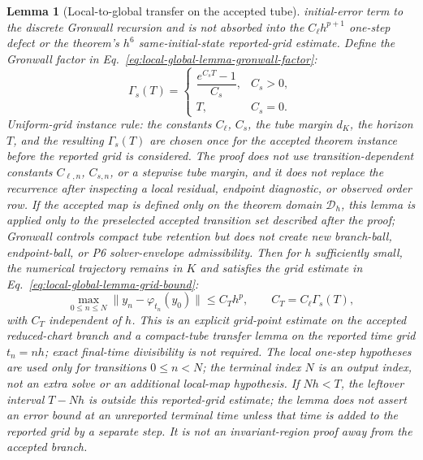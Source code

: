 \documentclass[preprint,12pt]{elsarticle}
\newtheorem{lemma}{Lemma}
\begin{document}
\begin{lemma}[Local-to-global transfer on the accepted tube]
initial-error term to the discrete Gronwall recursion and is not absorbed into
the \(C_\ell h^{p+1}\) one-step defect or the theorem's \(h^6\)
same-initial-state reported-grid estimate.
Define the Gronwall factor in
Eq.~\eqref{eq:local-global-lemma-gronwall-factor}:
\begin{equation}
\label{eq:local-global-lemma-gronwall-factor}
  \Gamma_s(T)=
  \begin{cases}
    \dfrac{e^{C_sT}-1}{C_s}, & C_s>0,\\[0.6em]
    T, & C_s=0 .
  \end{cases}
\end{equation}
Uniform-grid instance rule: the constants \(C_\ell\), \(C_s\), the tube
margin \(d_K\), the horizon \(T\), and the resulting \(\Gamma_s(T)\) are
chosen once for the accepted theorem instance before the reported grid is
considered.  The proof does not use transition-dependent constants
\(C_{\ell,n}\), \(C_{s,n}\), or a stepwise tube margin, and it does not
replace the recurrence after inspecting a local residual, endpoint diagnostic,
or observed order row.  If the accepted map is defined only on the theorem
domain \(\mathcal D_h\), this lemma is applied only to the preselected
accepted transition set described after the proof; Gronwall controls compact
tube retention but does not create new branch-ball, endpoint-ball, or P6
solver-envelope admissibility.
Then for \(h\) sufficiently small, the numerical trajectory remains in \(K\)
and satisfies the grid estimate in
Eq.~\eqref{eq:local-global-lemma-grid-bound}:
\begin{equation}
\label{eq:local-global-lemma-grid-bound}
  \max_{0\le n\le N}\|y_n-\varphi_{t_n}(y_0)\|
  \le C_T h^p,\qquad C_T=C_\ell\Gamma_s(T),
\end{equation}
with \(C_T\) independent of \(h\). This is an explicit grid-point estimate on
the accepted reduced-chart branch and a compact-tube transfer lemma on the
reported time grid \(t_n=n h\); exact final-time divisibility is not required.
The local one-step hypotheses are used only for transitions
\(0\le n<N\); the terminal index \(N\) is an output index, not an extra
solve or an additional local-map hypothesis.
If \(Nh<T\), the leftover interval \(T-Nh\) is outside this reported-grid
estimate; the lemma does not assert an error bound at an unreported terminal
time unless that time is added to the reported grid by a separate step.
It is not an invariant-region proof away from the accepted branch.
\end{lemma}
\end{document}
